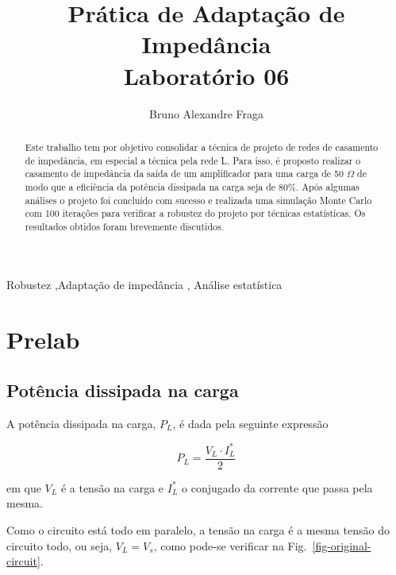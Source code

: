 \documentclass[
  number,
  preprint]{elsarticle}
\begin{document}
\begin{frontmatter}
\title{Prática de Adaptação de Impedância \\\large{Laboratório 06} }
\author[1]{Bruno Alexandre Fraga%
%
}



        
\begin{abstract}
Este trabalho tem por objetivo consolidar a técnica de projeto de redes
de casamento de impedância, em especial a técnica pela rede L. Para
isso, é proposto realizar o casamento de impedância da saída de um
amplificador para uma carga de 50 \(\Omega\) de modo que a eficiência da
potência dissipada na carga seja de 80\%. Após algumas análises o
projeto foi concluído com sucesso e realizada uma simulação Monte Carlo
com 100 iterações para verificar a robustez do projeto por técnicas
estatísticas. Os resultados obtidos foram brevemente discutidos.
\end{abstract}





\begin{keyword}
    Robustez \sep Adaptação de impedância \sep 
    Análise estatística
\end{keyword}
\end{frontmatter}
    

\section{Prelab}\label{prelab}

\subsection{Potência dissipada na
carga}\label{potuxeancia-dissipada-na-carga}

A potência dissipada na carga, \(P_L\), é dada pela seguinte expressão

\[
  P_L=\frac{V_L\cdot I_L^*}{2}
\]

em que \(V_L\) é a tensão na carga e \(I_L^*\) o conjugado da corrente
que passa pela mesma.

Como o circuito está todo em paralelo, a tensão na carga é a mesma
tensão do circuito todo, ou seja, \(V_L=V_s\), como pode-se verificar na
Fig.~\ref{fig-original-circuit}.
\end{document}
